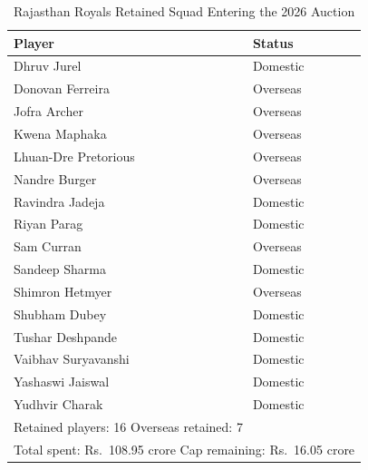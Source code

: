 \begin{table}[H]
\centering
\caption{Rajasthan Royals Retained Squad Entering the 2026 Auction}
\begin{tabular}{ll}
\toprule
Player & Status \\
\midrule
Dhruv Jurel & Domestic \\
Donovan Ferreira & Overseas \\
Jofra Archer & Overseas \\
Kwena Maphaka & Overseas \\
Lhuan-Dre Pretorious & Overseas \\
Nandre Burger & Overseas \\
Ravindra Jadeja & Domestic \\
Riyan Parag & Domestic \\
Sam Curran & Overseas \\
Sandeep Sharma & Domestic \\
Shimron Hetmyer & Overseas \\
Shubham Dubey & Domestic \\
Tushar Deshpande & Domestic \\
Vaibhav Suryavanshi & Domestic \\
Yashaswi Jaiswal & Domestic \\
Yudhvir Charak & Domestic \\
\midrule
\multicolumn{2}{l}{Retained players: 16 \quad Overseas retained: 7} \\
\multicolumn{2}{l}{Total spent: Rs.\ 108.95 crore \quad Cap remaining: Rs.\ 16.05 crore} \\
\bottomrule
\end{tabular}
\end{table}
